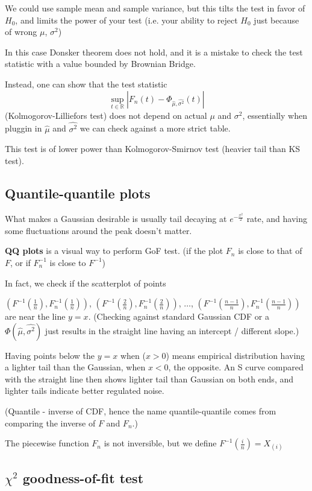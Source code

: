 \documentclass{article}
\begin{document}
We could use sample mean and sample variance, but this tilts the test in favor of $H_0$, and limits the power of your test (i.e. your ability to reject $H_0$ just because of wrong $\mu$, $\sigma^2$)

In this case Donsker theorem does not hold, and it is a mistake to check the test statistic with a value bounded by Brownian Bridge.

Instead, one can show that the test statistic
$$
\sup_{t \in \mathbb{R}}|F_n(t) - \Phi_{\hat{\mu}, \hat{\sigma^2}}(t)|
$$
(Kolmogorov-Lilliefors test) does not depend on actual $\mu$ and $\sigma^2$, essentially when pluggin in $\hat{\mu}$ and $\hat{\sigma^2}$ we can check against a more strict table.

This test is of lower power than Kolmogorov-Smirnov test (heavier tail than KS test).

\subsection{Quantile-quantile plots}

What makes a Gaussian desirable is usually tail decaying at $e^{-\frac{x^2}{2}}$ rate, and having some fluctuations around the peak doesn't matter.

\textbf{QQ plots} is a visual way to perform GoF test. (if the plot $F_n$ is close to that of $F$, or if $F^{-1}_n$ is close to $F^{-1}$)

In fact, we check if the scatterplot of points

$(F^{-1}(\frac{1}{n}), F_{n}^{-1}(\frac{1}{n}))$, $(F^{-1}(\frac{2}{n}), F_{n}^{-1}(\frac{2}{n}))$, $\dots$, $(F^{-1}(\frac{n - 1}{n}), F_{n}^{-1}(\frac{n - 1}{n}))$
are near the line $y = x$.
(Checking against standard Gaussian CDF or a $\Phi(\hat{\mu}, \hat{\sigma^2})$ just results in the straight line having an intercept / different slope.)

Having points below the $y = x$ when ($x > 0$) means empirical distribution having a lighter tail than the Gaussian, when $x < 0$, the opposite.
An S curve compared with the straight line then shows lighter tail than Gaussian on both ends, and lighter tails indicate better regulated noise.

(Quantile - inverse of CDF, hence the name quantile-quantile comes from comparing the inverse of $F$ and $F_n$.)

The piecewise function $F_n$ is not inversible, but we define $F^{-1}(\frac{i}{n}) = X_{(i)}$

\subsection{$\chi^2$ goodness-of-fit test}
\end{document}
